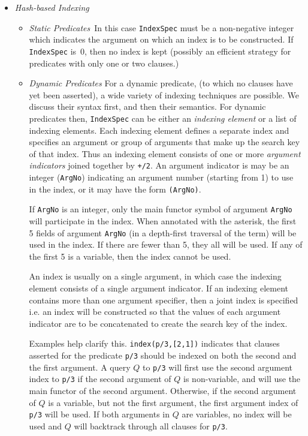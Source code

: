 \begin{description}
\begin{itemize}
\item {\em Hash-based Indexing} 
\begin{itemize}
\item {\em Static Predicates}\ 
In this case {\tt IndexSpec} must be a non-negative integer which
indicates the argument on which an index is to be constructed.  If
{\tt IndexSpec} is~0, then no index is kept (possibly an efficient
strategy for predicates with only one or two clauses.)
%
\item {\em Dynamic Predicates} For a dynamic predicate, (to which no
  clauses have yet been asserted), a wide variety of indexing
  techniques are possible.  We discuss their syntax first, and then
  their semantics.  For dynamic predicates then, {\tt IndexSpec} can
  be either an {\em indexing element} or a list of indexing elements.
  Each indexing element defines a separate index and specifies an
  argument or group of arguments that make up the search key of that
  index.  Thus an indexing element consists of one or more {\em
    argument indicators} joined together by {\tt +/2}.  An argument
  indicator is may be an integer ({\tt ArgNo}) indicating an argument
  number (starting from 1) to use in the index, or it may have the
  form {\tt *(ArgNo)}.

  If {\tt ArgNo} is an integer, only the main functor symbol of
  argument {\tt ArgNo} will participate in the index.  When annotated
  with the asterisk, the first 5 fields of argument {\tt ArgNo} (in a
  depth-first traversal of the term) will be used in the index.  If
  there are fewer than 5, they all will be used.  If any of the first
  5 is a variable, then the index cannot be used.

  An index is usually on a single argument, in which case the indexing
  element consists of a single argument indicator.  If an indexing
  element contains more than one argument specifier, then a joint
  index is specified i.e. an index will be constructed so that the
  values of each argument indicator are to be concatenated to create the
  search key of the index.

Examples help clarify this.  {\tt index(p/3,[2,1])} indicates that
clauses asserted for the predicate {\tt p/3} should be indexed on both
the second and the first argument.  A query $Q$ to {\tt p/3} will
first use the second argument index to {\tt p/3} if the second
argument of $Q$ is non-variable, and will use the main functor of the
second argument.  Otherwise, if the second argument of $Q$ is a
variable, but not the first argument, the first argument index of {\tt
  p/3} will be used.  If both arguments in $Q$ are variables, no index
will be used and $Q$ will backtrack through all clauses for {\tt p/3}.


\end{itemize}
\end{itemize}
\end{description}
